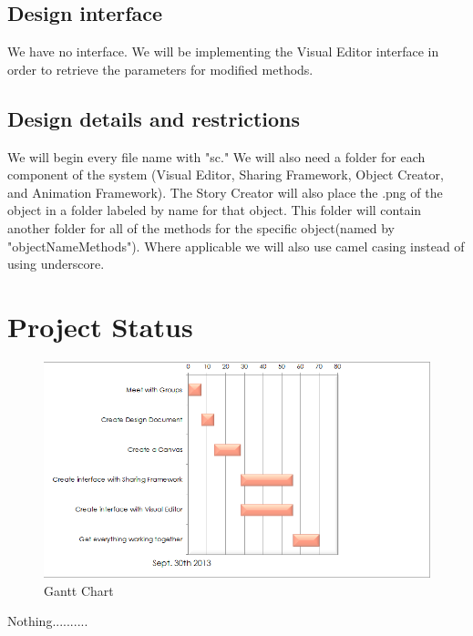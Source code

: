 \documentclass[12pt]{article}
\begin{document}
\subsection{Design interface}
We have no interface.  We will be implementing the Visual Editor interface in order to retrieve the parameters for modified methods.

\subsection{Design details and restrictions}
We will begin every file name with "sc."  We will also need a folder for each component of the system (Visual Editor, Sharing Framework, Object Creator, and Animation Framework).  The Story Creator will also place the .png of the object in a folder labeled by name for that object.  This folder will contain another folder for all of the methods for the specific object(named by "objectNameMethods").  Where applicable we will also use camel casing instead of using underscore.


\section{Project Status}

\begin{figure}[ht!]
\centering
\includegraphics{GanttChart.png}
\caption{Gantt Chart}
\label{overflow}
\end{figure}

Nothing..........




%
\end{document}
